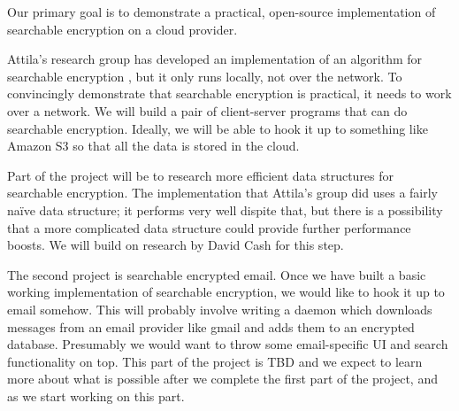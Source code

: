 \documentclass[onecolumn, draftclsnofoot,10pt, compsoc]{IEEEtran}
\begin{document}
Our primary goal is to demonstrate a practical, open-source implementation of searchable encryption on a cloud provider.




Attila's research group has developed an implementation of an algorithm for searchable encryption \cite{yavuz17},
but it only runs locally, not over the network.
To convincingly demonstrate that searchable encryption is practical, it needs to work over a network.
We will build a pair of client-server programs that can do searchable encryption.
Ideally, we will be able to hook it up to something like Amazon S3 so that all the data is stored in the cloud.


Part of the project will be to research more efficient data structures for searchable encryption.
The implementation that Attila's group did uses a fairly na\"ive data structure;
it performs very well dispite that, but there is a possibility that a more complicated data structure could provide further performance boosts.
We will build on research by David Cash for this step.
\cite{cryptoeprint:2014:853}



The second project is searchable encrypted email.
Once we have built a basic working implementation of searchable encryption,
we would like to hook it up to email somehow.
This will probably involve writing a daemon which downloads messages from an email provider like gmail
and adds them to an encrypted database.
Presumably we would want to throw some email-specific UI and search functionality on top.
This part of the project is TBD and we expect to learn more about what is possible after we complete the first part of the project, and as we start working on this part.
\end{document}
